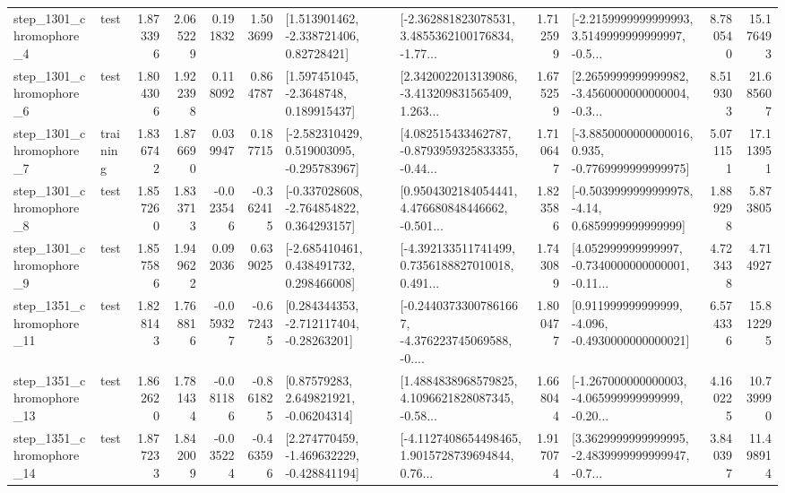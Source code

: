 \begin{tabular}{llrrrrllrlrr}
  step\_1301\_chromophore\_4 &      test &      1.873396 &    2.065229 &      0.191832 &  1.503699 &     [1.513901462, -2.338721406, 0.82728421] &  [-2.362881823078531, 3.4855362100176834, -1.77... &       1.712599 &  [-2.2159999999999993, 3.5149999999999997, -0.5... &            8.780540 &         15.176493 \\
  step\_1301\_chromophore\_6 &      test &      1.804306 &    1.922398 &      0.118092 &  0.864787 &      [1.597451045, -2.3648748, 0.189915437] &  [2.3420022013139086, -3.413209831565409, 1.263... &       1.675259 &  [2.2659999999999982, -3.4560000000000004, -0.3... &            8.519303 &         21.685607 \\
  step\_1301\_chromophore\_7 &  training &      1.836742 &    1.876690 &      0.039947 &  0.187715 &   [-2.582310429, 0.519003095, -0.295783967] &  [4.082515433462787, -0.8793959325833355, -0.44... &       1.710647 &  [-3.8850000000000016, 0.935, -0.7769999999999975] &            5.071151 &         17.113951 \\
  step\_1301\_chromophore\_8 &      test &      1.857260 &    1.833713 &     -0.023546 & -0.362415 &   [-0.337028608, -2.764854822, 0.364293157] &  [0.9504302184054441, 4.476680848446662, -0.501... &       1.823586 &   [-0.5039999999999978, -4.14, 0.6859999999999999] &            1.889298 &          5.873805 \\
  step\_1301\_chromophore\_9 &      test &      1.857586 &    1.949622 &      0.092036 &  0.639025 &    [-2.685410461, 0.438491732, 0.298466008] &  [-4.392133511741499, 0.7356188827010018, 0.491... &       1.743089 &  [4.052999999999997, -0.7340000000000001, -0.11... &            4.723438 &          4.714927 \\
 step\_1351\_chromophore\_11 &      test &      1.828143 &    1.768816 &     -0.059327 & -0.672435 &    [0.284344353, -2.712117404, -0.28263201] &  [-0.24403733007861667, -4.376223745069588, -0.... &       1.800477 &   [0.911999999999999, -4.096, -0.4930000000000021] &            6.574336 &         15.812295 \\
 step\_1351\_chromophore\_13 &      test &      1.862620 &    1.781434 &     -0.081186 & -0.861825 &      [0.87579283, 2.649821921, -0.06204314] &  [1.4884838968579825, 4.1096621828087345, -0.58... &       1.668044 &  [-1.267000000000003, -4.065999999999999, -0.20... &            4.160225 &         10.739990 \\
 step\_1351\_chromophore\_14 &      test &      1.877233 &    1.842009 &     -0.035224 & -0.463596 &   [2.274770459, -1.469632229, -0.428841194] &  [-4.1127408654498465, 1.9015728739694844, 0.76... &       1.917074 &  [3.3629999999999995, -2.4839999999999947, -0.7... &            3.840397 &         11.498914 \\

\end{tabular}

